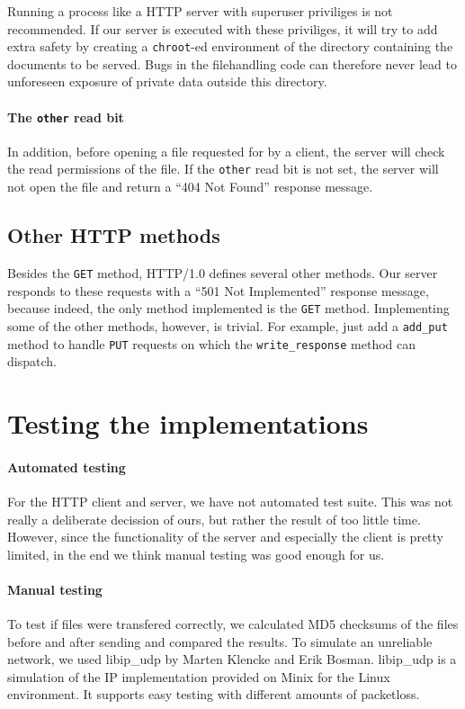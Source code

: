 \documentclass[11pt]{article}
\begin{document}
Running a process like a HTTP server with superuser priviliges is not
recommended. If our server is executed with these priviliges, it will try to
add extra safety by creating a \lstinline|chroot|-ed environment of the
directory containing the documents to be served. Bugs in the filehandling code
can therefore never lead to unforeseen exposure of private data outside this
directory.

\paragraph{The \lstinline|other| read bit}

In addition, before opening a file requested for by a client, the server will
check the read permissions of the file. If the \lstinline|other| read bit is
not set, the server will not open the file and return a ``404 Not Found''
response message.


\subsection{Other HTTP methods}

Besides the \lstinline|GET| method, HTTP/1.0 defines several other
methods. Our server responds to these requests with a ``501 Not Implemented''
response message, because indeed, the only method implemented is the
\lstinline|GET| method. Implementing some of the other methods, however, is
trivial. For example, just add a \lstinline|add_put| method to handle
\lstinline|PUT| requests on which the \lstinline|write_response| method can
dispatch.


\section{Testing the implementations}

\paragraph{Automated testing}

For the HTTP client and server, we have not automated test suite. This was not
really a deliberate decission of ours, but rather the result of too little
time. However, since the functionality of the server and especially the client
is pretty limited, in the end we think manual testing was good enough for us.

\paragraph{Manual testing}

To test if files were transfered correctly, we calculated MD5 checksums of the
files before and after sending and compared the results. To simulate an
unreliable network, we used libip\_udp by Marten Klencke and Erik
Bosman. libip\_udp is a simulation of the IP implementation provided on Minix
for the Linux environment. It supports easy testing with different amounts of
packetloss.
\end{document}
